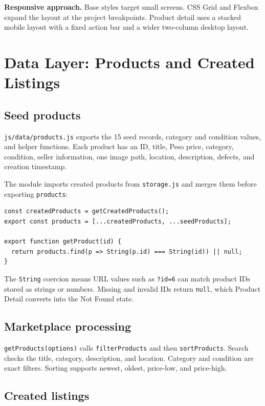 \documentclass[10pt]{article}
\newcommand{\code}[1]{\texttt{#1}}
\begin{document}
\begin{infobox}
\textbf{Responsive approach.} Base styles target small screens. CSS Grid and Flexbox expand the layout at the project breakpoints. Product detail uses a stacked mobile layout with a fixed action bar and a wider two-column desktop layout.
\end{infobox}

\clearpage
\section{Data Layer: Products and Created Listings}

\subsection{Seed products}

\code{js/data/products.js} exports the 15 seed records, category and condition values, and helper functions. Each product has an ID, title, Peso price, category, condition, seller information, one image path, location, description, defects, and creation timestamp.

The module imports created products from \code{storage.js} and merges them before exporting \code{products}:

\begin{lstlisting}
const createdProducts = getCreatedProducts();
export const products = [...createdProducts, ...seedProducts];

export function getProduct(id) {
  return products.find(p => String(p.id) === String(id)) || null;
}
\end{lstlisting}

The \code{String} coercion means URL values such as \code{?id=6} can match product IDs stored as strings or numbers. Missing and invalid IDs return \code{null}, which Product Detail converts into the Not Found state.

\subsection{Marketplace processing}

\code{getProducts(options)} calls \code{filterProducts} and then \code{sortProducts}. Search checks the title, category, description, and location. Category and condition are exact filters. Sorting supports newest, oldest, price-low, and price-high.

\subsection{Created listings}
\end{document}
